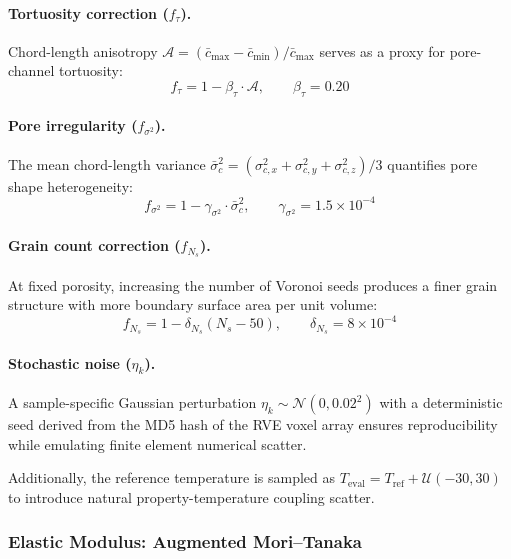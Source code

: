 \documentclass[11pt,a4paper]{article}
\begin{document}
\paragraph{Tortuosity correction ($f_\tau$).}
Chord-length anisotropy $\mathcal{A} = (\bar{c}_{\max} - \bar{c}_{\min})/\bar{c}_{\max}$ serves as a proxy for pore-channel tortuosity:
\begin{equation}
    f_\tau = 1 - \beta_\tau \cdot \mathcal{A}, \qquad \beta_\tau = 0.20
\end{equation}

\paragraph{Pore irregularity ($f_{\sigma^2}$).}
The mean chord-length variance $\bar{\sigma}^2_c = (\sigma^2_{c,x} + \sigma^2_{c,y} + \sigma^2_{c,z})/3$ quantifies pore shape heterogeneity:
\begin{equation}
    f_{\sigma^2} = 1 - \gamma_{\sigma^2} \cdot \bar{\sigma}^2_c, \qquad \gamma_{\sigma^2} = 1.5 \times 10^{-4}
\end{equation}

\paragraph{Grain count correction ($f_{N_s}$).}
At fixed porosity, increasing the number of Voronoi seeds produces a finer grain structure with more boundary surface area per unit volume:
\begin{equation}
    f_{N_s} = 1 - \delta_{N_s}(N_s - 50), \qquad \delta_{N_s} = 8 \times 10^{-4}
\end{equation}

\paragraph{Stochastic noise ($\eta_k$).}
A sample-specific Gaussian perturbation $\eta_k \sim \mathcal{N}(0, 0.02^2)$ with a deterministic seed derived from the MD5 hash of the RVE voxel array ensures reproducibility while emulating finite element numerical scatter.

Additionally, the reference temperature is sampled as $T_{\text{eval}} = T_{\text{ref}} + \mathcal{U}(-30, 30)$ to introduce natural property-temperature coupling scatter.

\subsubsection{Elastic Modulus: Augmented Mori--Tanaka}
\end{document}

